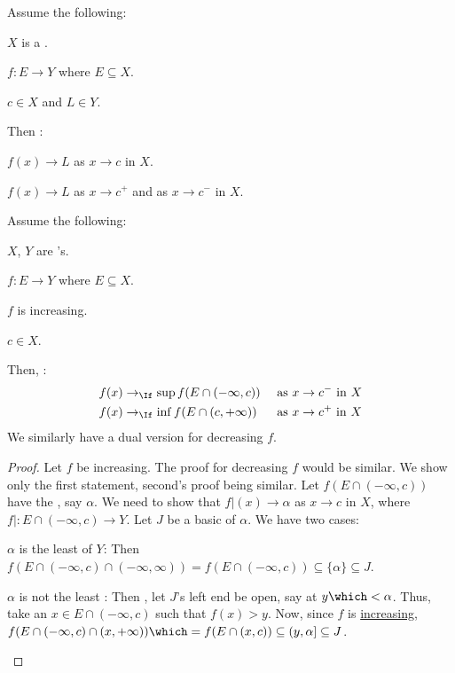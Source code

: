 	\begin{lem}\label{LEM: limits via the left and right hand limits}
		Assume the following:
		\begin{assmplist}
			\item $X$ is a \LOTS.
			\item $f\colon E\to Y$ where $E\subseteq X$.
			\item $c\in X$ and $L\in Y$.
		\end{assmplist}
		Then \tfae:
		\begin{mylist}
			\item $f(x)\to L$ as $x\to c$ in $X$.
			
			\item $f(x)\to L$ as $x\to c^+$ and as $x\to c^-$ in $X$.
		\end{mylist}
	\end{lem}
	
	
	\begin{prp}\label{PRP: one-sided lims of monotonics}
		Assume the following:
		\begin{assmplist}
			\item $X$, $Y$ are \LOTS's.
			\item $f\colon E\to Y$ where $E\subseteq X$.
			\item $f$ is increasing.
			\item $c\in X$.
		\end{assmplist}
		Then, \tfh:
		\begin{alignat*}{2}
			f(x)& \to_\If \sup f(E\cap (-\infty, c)) &&\text{ as $x\to c^-$ in $X$}\\
			f(x)& \to_\If \inf f(E\cap (c, +\infty)) &&\text{ as $x\to c^+$ in $X$}
		\end{alignat*}
		We similarly have a dual version for decreasing $f$.
	\end{prp}
	
	\begin{proof}
		Let $f$ be increasing. The proof for decreasing $f$ would be similar. We show only the first statement, second's proof being similar. Let $f(E\cap (-\infty, c))$ have the \lub, say $\alpha$. We need to show that $f|(x)\to \alpha$ as $x\to c$ in $X$, where $f|\colon E\cap (-\infty, c)\to Y$. Let $J$ be a basic \onbd of $\alpha$. We have two cases:
		\begin{mylist}
			\item $\alpha$ is the least \elt of $Y$: Then $f(E\cap (-\infty, c)\cap (-\infty, \infty)) = f(E\cap (-\infty, c))\subseteq \{\alpha\}\subseteq J$.
			
			\item $\alpha$ is not the least \elt: Then \wlogg, let $J$'s left end be open, say at $y \which < \alpha$. Thus, take an $x\in E\cap (-\infty, c)$ such that $f(x) > y$. Now, since $f$ is \uline{increasing}, $f(E\cap (-\infty, c)\cap (x, +\infty))\which = f(E\cap (x, c))\subseteq (y, \alpha]\subseteq J$.
			\qedhere
		\end{mylist}
	\end{proof}
	
